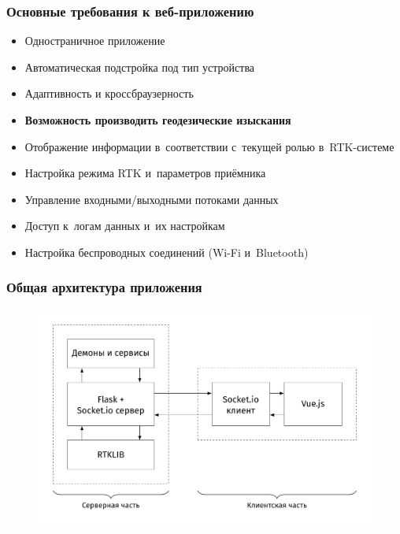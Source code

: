 \documentclass[xetex,с,aspectratio=169]{beamer}
\begin{document}
%
%
\begin{frame}
  \frametitle{Основные требования к веб-приложению}
  
  \large
  
  \begin{itemize}
    \setlength\itemsep{0.5em}
    \item Одностраничное приложение
    \item Автоматическая подстройка под тип устройства
    \item Адаптивность и кроссбраузерность
  \end{itemize}
  \begin{center}
    \vskip -0.7cm
    \color{ifmoblue}{\rule{.5\textwidth}{0.5pt}}
  \end{center}
  \vskip -0.5cm
  \begin{itemize}
    \setlength\itemsep{0.5em}
    \item \textbf{Возможность производить геодезические изыскания}
    \item Отображение информации в~соответствии с~текущей ролью в~RTK-системе
    \item Настройка режима RTK и~параметров приёмника
    \item Управление входными/выходными потоками данных
    \item Доступ к~логам данных и~их настройкам
    \item Настройка беспроводных соединений (Wi-Fi и~Bluetooth)
  \end{itemize}
\end{frame}


%
%
\begin{frame}
  \frametitle{Общая архитектура приложения}
  \vskip -0.5cm
  \begin{figure}[h]
    \centering
    \includegraphics[width=.75\textwidth]{../img/tikz/system-architecture/pic_sans_no-border}
  \end{figure}
\end{frame}
\end{document}
